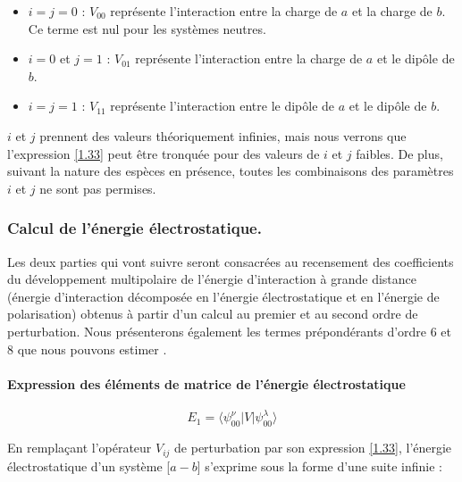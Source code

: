 	\begin{itemize}
		\item $i=j=0$ : $V_{00}$ représente l'interaction entre la charge de $a$ et la charge de $b$. Ce terme est nul pour les systèmes neutres. 	
		\item $i=0$ et $j=1$ : $V_{01}$ représente l'interaction entre la charge de $a$ et le dipôle de $b$. 	
		\item $i=j=1$ : $V_{11}$ représente l'interaction entre le dipôle de $a$ et le dipôle de $b$.
	\end{itemize}
	
	$i$ et $j$ prennent des valeurs théoriquement infinies, mais nous verrons que l'expression \ref{1.33} peut être tronquée pour des valeurs de $i$ et $j$ faibles. De plus, suivant la nature des espèces en présence, toutes les combinaisons des paramètres $i$ et $j$ ne sont pas permises.
	
	
	
	
	\subsubsection{Calcul de l’énergie électrostatique.}
	
	
	Les deux parties qui vont suivre seront consacrées au recensement des coefficients du développement multipolaire de l’énergie d'interaction à grande distance (énergie d’interaction décomposée en l'énergie électrostatique et en l'énergie de polarisation) obtenus à partir d'un calcul au premier et au second ordre de perturbation. Nous présenterons également les termes prépondérants d'ordre 6 et 8 que nous pouvons estimer \cite{saute1982calculated}.
	
	\paragraph{Expression des éléments de matrice de l'énergie électrostatique}
	
	\begin{equation}
	E_{1} = \langle \psi_{00}^{\nu}|V| \psi_{00}^{\lambda}\rangle
	\end{equation}
	
	
	En remplaçant l'opérateur $V_{ij}$ de perturbation par son expression \ref{1.33}, l'énergie électrostatique d'un système [$a-b$] s'exprime sous la forme d'une suite infinie : 
	
